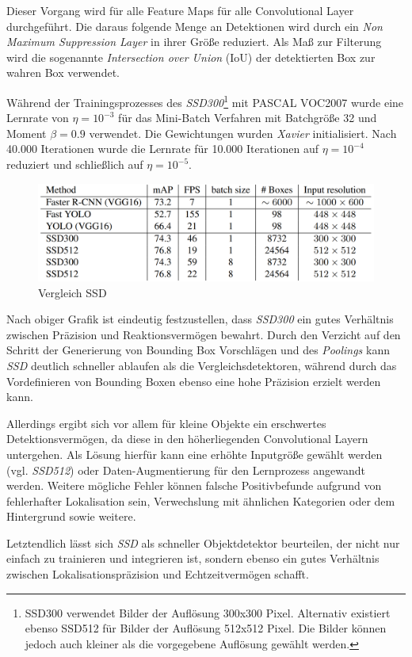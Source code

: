 Dieser Vorgang wird für alle Feature Maps für alle Convolutional Layer durchgeführt. Die daraus folgende Menge an Detektionen wird durch ein \textit{Non Maximum Suppression Layer} in ihrer Größe reduziert. Als Maß zur Filterung wird die sogenannte \textit{Intersection over Union} (IoU) der detektierten Box zur wahren Box verwendet. \cite{ssd.20161229} 

Während der Trainingsprozesses des \textit{SSD300}\footnote{SSD300 verwendet Bilder der Auflösung 300x300 Pixel. Alternativ existiert ebenso SSD512 für Bilder der Auflösung 512x512 Pixel. Die Bilder können jedoch auch kleiner als die vorgegebene Auflösung gewählt werden.} mit PASCAL VOC2007 wurde eine Lernrate von $\eta = 10^{-3}$ für das Mini-Batch Verfahren mit Batchgröße 32 und Moment $\beta = 0.9$ verwendet. Die Gewichtungen wurden \textit{Xavier} initialisiert. Nach 40.000 Iterationen wurde die Lernrate für 10.000 Iterationen auf $\eta = 10^{-4}$ reduziert und schließlich auf $\eta = 10^{-5}$. \cite{ssd.20161229} 

\begin{figure}[ht]
	\begin{center}
		\includegraphics[width=16cm]{Bilder/ssd_results.png} 
		\caption[Vergleich SSD]{Vergleich SSD \cite{ssd.20161229}}
		\label{result}
	\end{center}
\end{figure}

Nach obiger Grafik ist eindeutig festzustellen, dass \textit{SSD300} ein gutes Verhältnis zwischen Präzision und Reaktionsvermögen bewahrt. Durch den Verzicht auf den Schritt der Generierung von Bounding Box Vorschlägen und des \textit{Poolings} kann \textit{SSD} deutlich schneller ablaufen als die Vergleichsdetektoren, während durch das Vordefinieren von Bounding Boxen ebenso eine hohe Präzision erzielt werden kann. \cite{ssd.20161229}  

Allerdings ergibt sich vor allem für kleine Objekte ein erschwertes Detektionsvermögen, da diese in den höherliegenden Convolutional Layern untergehen. Als Lösung hierfür kann eine erhöhte Inputgröße gewählt werden (vgl. \textit{SSD512}) oder Daten-Augmentierung für den Lernprozess angewandt werden. Weitere mögliche Fehler können falsche Positivbefunde aufgrund von fehlerhafter Lokalisation sein, Verwechslung mit ähnlichen Kategorien oder dem Hintergrund sowie weitere. \cite{ssd.20161229}  

Letztendlich lässt sich \textit{SSD} als schneller Objektdetektor beurteilen, der nicht nur einfach zu trainieren und integrieren ist, sondern ebenso ein gutes Verhältnis zwischen Lokalisationspräzision und Echtzeitvermögen schafft.
